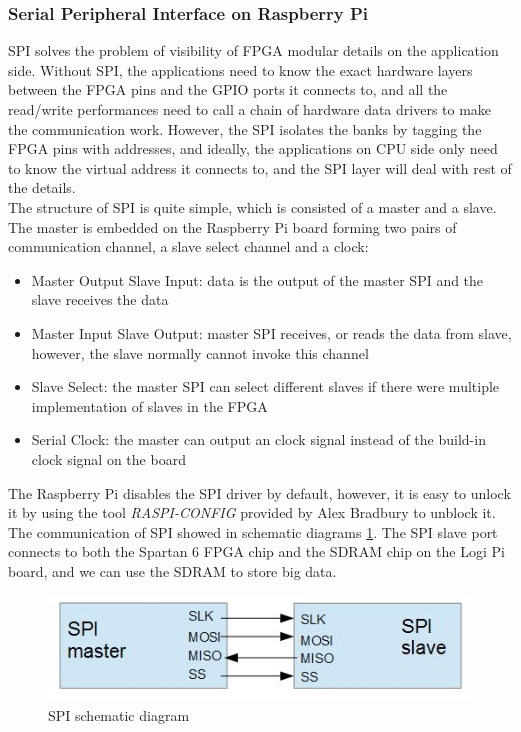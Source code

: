 \documentclass[11pt,openright,a4paper]{report}
\begin{document}
\subsubsection{Serial Peripheral Interface on Raspberry Pi}
SPI solves the problem of visibility of FPGA modular details on the application side. Without SPI, the applications need to know the exact hardware layers between the FPGA pins and the GPIO ports it connects to, and all the read/write performances need to call a chain of hardware data drivers to make the communication work. However, the SPI isolates the banks by tagging the FPGA pins with addresses, and ideally, the applications on CPU side only need to know the virtual address it connects to, and the SPI layer will deal with rest of the details.\\ 
The structure of SPI is quite simple, which is consisted of a master and a slave. The master is embedded on the Raspberry Pi board forming two pairs of communication channel, a slave select channel and a clock:
\begin{itemize}
	\item Master Output Slave Input: data is the output of the master SPI and the slave receives the data
	\item Master Input Slave Output: master SPI receives, or reads the data from slave, however, the slave normally cannot invoke this channel
	\item Slave Select: the master SPI can select different slaves if there were multiple implementation of slaves in the FPGA
	\item Serial Clock: the master can output an clock signal instead of the build-in clock signal on the board
\end{itemize}
The Raspberry Pi disables the SPI driver by default\cite{rasppispi}, however, it is easy to unlock it by using the tool \textit{RASPI-CONFIG} provided by Alex Bradbury to unblock it\cite{rasppiconfig}. The communication of SPI showed in schematic diagrams \ref{fig:spi}. The SPI slave port connects to both the Spartan 6 FPGA chip and the SDRAM chip on the Logi Pi board, and we can use the SDRAM to store big data.\\
\begin{figure}[H]
\centering
\includegraphics[width=0.5\linewidth]{picture/spi}
\caption{SPI schematic diagram}
\label{fig:spi}
\end{figure}
\end{document}
